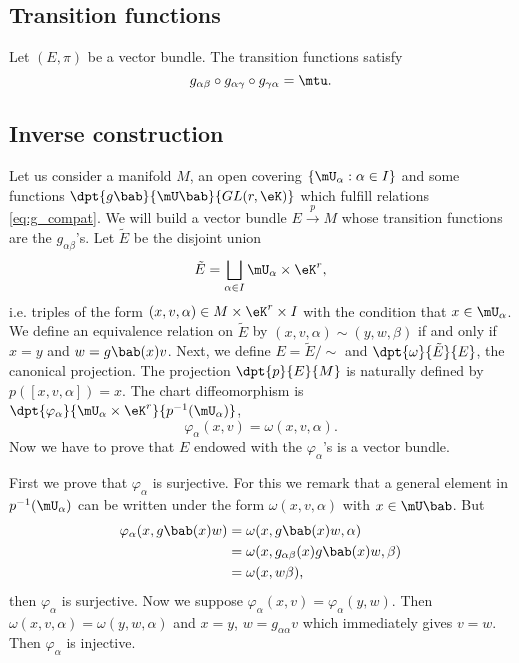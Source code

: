 \subsection{Transition functions}

\begin{proposition}
	Let \( (E,\pi)\) be a vector bundle. The transition functions satisfy
	\begin{equation}\label{eq:g_compat}
		g_{\alpha\beta}\circ g_{\alpha\gamma}\circ g_{\gamma\alpha}=\mtu.
	\end{equation}
\end{proposition}

\subsection{Inverse construction}\label{subsec:inv_g}

Let us consider a manifold $M$, an open covering $\{\mU_{\alpha}:\alpha\in I\}$ and some functions $\dpt{g\bab}{\mU\bab}{GL(r,\eK)}$ which fulfill relations \eqref{eq:g_compat}. We will build a vector bundle $E\stackrel{p}{\longrightarrow}M$ whose transition functions are the $g_{\alpha\beta}$'s. Let $\tilde{E}$ be the disjoint union
\[
	\tilde{E}=\bigsqcup_{\alpha\in I}\mU_{\alpha}\times\eK^r,
\]
i.e. triples of the form $(x,v,\alpha)\in M\times\eK^r\times I$ with the condition that $x\in\mU_{\alpha}$. We define an equivalence relation on $\tilde{E}$ by $(x,v,\alpha)\sim(y,w,\beta)$ if and only if $x=y$ and $w=g\bab(x)v$. Next, we define $E=\tilde{E}/\sim$ and $\dpt{\omega}{\tilde{E}}{E}$, the canonical projection. The projection $\dpt{p}{E}{M}$ is naturally defined by $p([x,v,\alpha])=x$. The chart diffeomorphism is $\dpt{\varphi_{\alpha}}{\mU_{\alpha}\times\eK^r}{p^{-1}(\mU_{\alpha})}$,
\[
	\varphi_{\alpha}(x,v)=\omega(x,v,\alpha).
\]
Now we have to prove that $E$ endowed with the $\varphi_{\alpha}$'s is a vector bundle.

First we prove that $\varphi_{\alpha}$ is surjective. For this we remark that a general element in $p^{-1}(\mU_{\alpha})$ can be written under the form $\omega(x,v,\alpha)$ with $x\in\mU\bab$. But
\begin{equation}
	\begin{split}
		\varphi_{\alpha}(x,g\bab(x)w)&=\omega(x,g\bab(x)w,\alpha)\\
		&=\omega(x,g_{\alpha\beta}(x)g\bab(x)w,\beta)\\
		&=\omega(x,w\beta),
	\end{split}
\end{equation}
then $\varphi_{\alpha}$ is surjective. Now we suppose $\varphi_{\alpha}(x,v)=\varphi_{\alpha}(y,w)$. Then $\omega(x,v,\alpha)=\omega(y,w,\alpha)$ and $x=y$, $w=g_{\alpha\alpha}v$ which immediately gives $v=w$. Then $\varphi_{\alpha}$ is injective.

